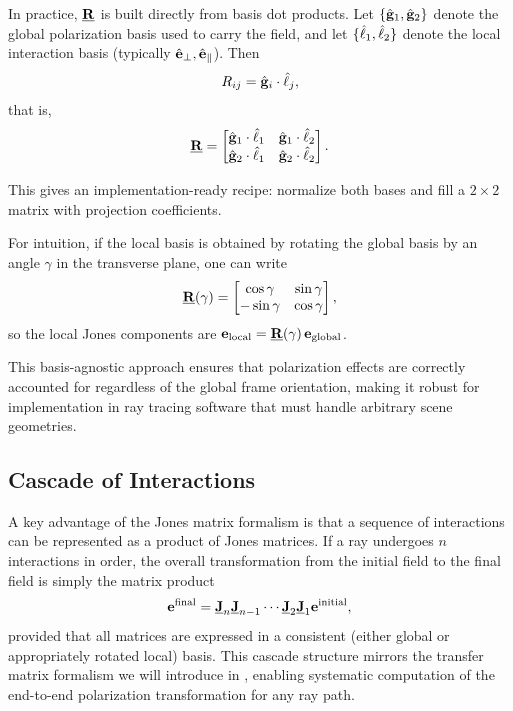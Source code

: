 In practice, $\underline{\mathbf{R}}$ is built directly from basis dot products. Let $\{\hat{\mathbf{g}}_1,\hat{\mathbf{g}}_2\}$ denote the global polarization basis used to carry the field, and let $\{\hat{\mathbf{\ell}}_1,\hat{\mathbf{\ell}}_2\}$ denote the local interaction basis (typically $\hat{\mathbf{e}}_{\perp},\hat{\mathbf{e}}_{\parallel}$). Then
\begin{equation}
  R_{ij} = \hat{\mathbf{g}}_i \cdot \hat{\mathbf{\ell}}_j,
\end{equation}
that is,
\begin{equation}
  \underline{\mathbf{R}} =
  \begin{bmatrix}
    \hat{\mathbf{g}}_1 \cdot \hat{\mathbf{\ell}}_1 & \hat{\mathbf{g}}_1 \cdot \hat{\mathbf{\ell}}_2 \\
    \hat{\mathbf{g}}_2 \cdot \hat{\mathbf{\ell}}_1 & \hat{\mathbf{g}}_2 \cdot \hat{\mathbf{\ell}}_2
  \end{bmatrix}.\label{eq:rotation-dot-products}
\end{equation}

This gives an implementation-ready recipe: normalize both bases and fill a $2\times2$ matrix with projection coefficients.

For intuition, if the local basis is obtained by rotating the global basis by an angle $\gamma$ in the transverse plane, one can write
\begin{equation}
  \underline{\mathbf{R}}(\gamma) =
  \begin{bmatrix}
    \cos\gamma & \sin\gamma \\
    -\sin\gamma & \cos\gamma
  \end{bmatrix},
\end{equation}
so the local Jones components are $\mathbf{e}_{\text{local}}=\underline{\mathbf{R}}(\gamma)\,\mathbf{e}_{\text{global}}$.

This basis-agnostic approach ensures that polarization effects are correctly accounted for regardless of the global frame orientation, making it robust for implementation in ray tracing software that must handle arbitrary scene geometries.

\subsection{Cascade of Interactions}

A key advantage of the Jones matrix formalism is that a sequence of interactions can be represented as a product of Jones matrices. If a ray undergoes $n$ interactions in order, the overall transformation from the initial field to the final field is simply the matrix product
\begin{equation}
  \mathbf{e}^{\text{final}} = \underline{\mathbf{J}}_n \underline{\mathbf{J}}_{n-1} \cdots \underline{\mathbf{J}}_2 \underline{\mathbf{J}}_1 \mathbf{e}^{\text{initial}},\label{eq:cascade}
\end{equation}
provided that all matrices are expressed in a consistent (either global or appropriately rotated local) basis. This cascade structure mirrors the transfer matrix formalism we will introduce in , enabling systematic computation of the end-to-end polarization transformation for any ray path.

